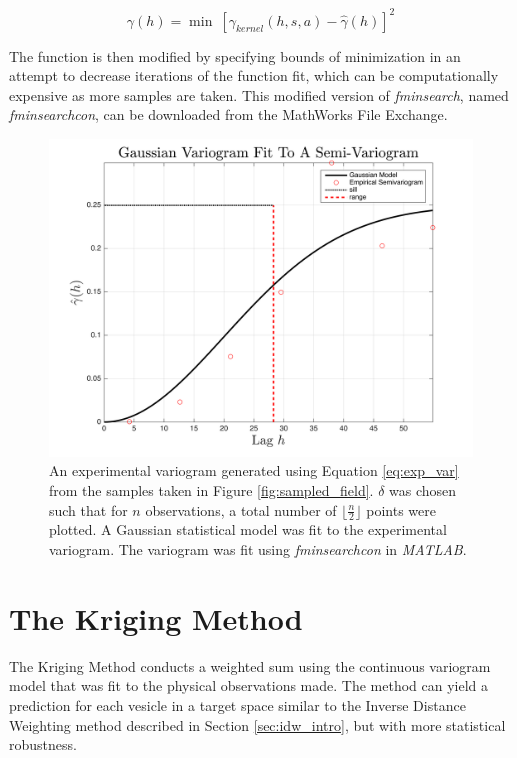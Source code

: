 \begin{equation}
    \gamma(h) = \min\ [\gamma_{kernel}(h,s,a) - \hat{\gamma}(h)]^2
    \label{eq:matlabfmin}
\end{equation}

\noindent The function is then modified by specifying bounds of minimization in an attempt to decrease iterations of the function fit, which can be computationally expensive as more samples are taken. This modified version of \textit{fminsearch}, named \textit{fminsearchcon}, can be downloaded from the MathWorks File Exchange.

\begin{figure}[ht!]
    \centering    
	\includegraphics[width=0.8\linewidth]{figures/fit_kernel.png}
    \ssp
	\caption{An experimental variogram generated using Equation \ref{eq:exp_var} from the samples taken in Figure \ref{fig:sampled_field}. $\delta$ was chosen such that for $n$ observations, a total number of $\Big\lfloor \frac{n}{2} \Big\rfloor$ points were plotted. A Gaussian statistical model was fit to the experimental variogram. The variogram was fit using \textit{fminsearchcon} in \textit{MATLAB}.}
	\label{fig:fit_kernel}
\end{figure}

\section{The Kriging Method}
The Kriging Method conducts a weighted sum using the continuous variogram model that was fit to the physical observations made. The method can yield a prediction for each vesicle in a target space similar to the Inverse Distance Weighting method described in Section \ref{sec:idw_intro}, but with more statistical robustness.

